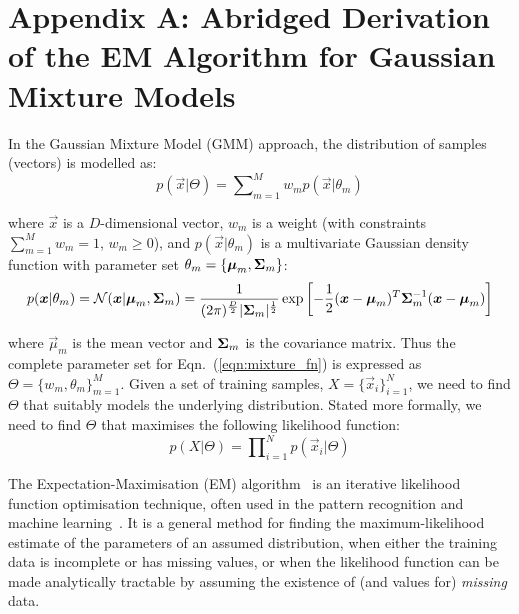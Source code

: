 \section*{Appendix A: Abridged Derivation of the EM Algorithm for Gaussian Mixture Models}
\label{app:em_algorithm}

In the Gaussian Mixture Model (GMM) approach, the distribution of samples (vectors) is modelled as:
%
\begin{equation}
	p(\Vec{x} | \Theta) = \sum\nolimits_{m=1}^{M} w_m p(\Vec{x}| \theta_m)
	\label{eqn:mixture_fn}
\end{equation}

\noindent
where $\Vec{x}$ is a $D$-dimensional vector,
$w_m$ is a weight (with constraints $\sum\nolimits_{m=1}^{M} w_m = 1$, $w_m \geq 0$),
and
$p(\Vec{x}| \theta_m)$ is a multivariate Gaussian density function with parameter set $\theta_m = \{ {\boldsymbol{\mu}}_m, {\boldsymbol{\Sigma}}_m \}$:
%
\begin{equation}
	p(\Vec{x}| \theta_m) =  {{\mathcal{N}}}( \Vec{x} | \Vec{\mu}_m, \Mat{\Sigma}_m )  = 
		\frac{1}{ (2\pi)^{\frac{D}{2}} | \Mat{\Sigma}_m|^{\frac{1}{2}} }
		\exp \left[ -\frac{1}{2} (\Vec{x}-\Vec{\mu}_m)^T \Mat{\Sigma}_m^{-1} (\Vec{x}-\Vec{\mu}_m) \right]
%
\end{equation}%

\noindent
where $\Vec{\mu}_m$ is the mean vector and ${\boldsymbol{\Sigma}}_m$ is the covariance matrix.
Thus the complete parameter set for Eqn.~(\ref{eqn:mixture_fn}) is expressed as $\Theta = \{w_m, \theta_m\}_{m=1}^{M}$.
Given a set of training samples, $X=\{\Vec{x}_i\}_{i=1}^{N}$,
we need to find $\Theta$ that suitably models the underlying distribution.
Stated more formally, we need to find $\Theta$ that maximises the following likelihood function:
%
\begin{equation}
	p(X | \Theta) = \prod\nolimits_{i=1}^{N} p(\Vec{x}_i | \Theta)
	\label{eqn:lhood_fn}
\end{equation}

The Expectation-Maximisation (EM) algorithm~\cite{Dempster77, McLachlan-2008, Moon96, Redner84} is an iterative likelihood function optimisation technique,
often used in the pattern recognition and machine learning~\cite{Bishop_2006,Duda01}.
It is a general method for finding the maximum-likelihood estimate of the parameters of an assumed distribution,
when either the training data is incomplete or has missing values, or when the likelihood function can be made analytically tractable
by assuming the existence of (and values for) {\it missing} data.

